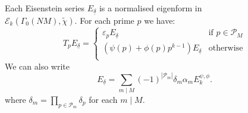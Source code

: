 \documentclass[10pt,a4paper]{amsart}
\begin{document}
\begin{lemma}
\label{lemma:E}
Each Eisenstein series $E_{\underline{\delta}}$ is a normalised eigenform in \\ $\mathcal{E}_k(\Gamma_0(NM), \tilde{\chi})$. For each prime $p$ we have:
\begin{equation*}
T_p E_{\underline{\delta}}=
\begin{cases}
 \varepsilon_pE_{\underline{\delta}} & \text{if } p \in \mathcal{P}_M \\
 (\psi(p)+\phi(p)p^{k-1})E_{\underline{\delta}} & \text{otherwise} \\
\end{cases}
\end{equation*}
We can also write 
\begin{equation}
\label{eq:altE}
    E_{\underline{\delta}}=\sum_{m \mid M}(-1)^{|\mathcal{P}_m|} \delta_m \alpha_m E_k^{\psi,\phi}.
\end{equation}
where $\delta_m = \prod_{p \in \mathcal{P}_m} \delta_p$ for each $m\mid M$.
\end{lemma}
\end{document}
